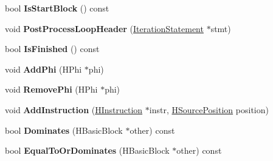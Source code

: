 \begin{DoxyCompactItemize}
\item 
\hypertarget{classv8_1_1internal_1_1_v8___f_i_n_a_l_a2f1d319c2f3bea0f2bbb9d9c973ba372}{}bool {\bfseries Is\+Start\+Block} () const \label{classv8_1_1internal_1_1_v8___f_i_n_a_l_a2f1d319c2f3bea0f2bbb9d9c973ba372}

\item 
\hypertarget{classv8_1_1internal_1_1_v8___f_i_n_a_l_a4c2c1ecf1521e56dd01d13b24f53dd83}{}void {\bfseries Post\+Process\+Loop\+Header} (\hyperlink{classv8_1_1internal_1_1_iteration_statement}{Iteration\+Statement} $\ast$stmt)\label{classv8_1_1internal_1_1_v8___f_i_n_a_l_a4c2c1ecf1521e56dd01d13b24f53dd83}

\item 
\hypertarget{classv8_1_1internal_1_1_v8___f_i_n_a_l_a4defc8dc7df624b3bd15acfb2e90af6b}{}bool {\bfseries Is\+Finished} () const \label{classv8_1_1internal_1_1_v8___f_i_n_a_l_a4defc8dc7df624b3bd15acfb2e90af6b}

\item 
\hypertarget{classv8_1_1internal_1_1_v8___f_i_n_a_l_a19d44c5d0691ad4751c7a1bf9ccd83e6}{}void {\bfseries Add\+Phi} (H\+Phi $\ast$phi)\label{classv8_1_1internal_1_1_v8___f_i_n_a_l_a19d44c5d0691ad4751c7a1bf9ccd83e6}

\item 
\hypertarget{classv8_1_1internal_1_1_v8___f_i_n_a_l_a111d82117cd63dbb69b87e30c1d7a3d6}{}void {\bfseries Remove\+Phi} (H\+Phi $\ast$phi)\label{classv8_1_1internal_1_1_v8___f_i_n_a_l_a111d82117cd63dbb69b87e30c1d7a3d6}

\item 
\hypertarget{classv8_1_1internal_1_1_v8___f_i_n_a_l_a0756352a57ec0c808f16177b287d8ddf}{}void {\bfseries Add\+Instruction} (\hyperlink{classv8_1_1internal_1_1_h_instruction}{H\+Instruction} $\ast$instr, \hyperlink{classv8_1_1internal_1_1_h_source_position}{H\+Source\+Position} position)\label{classv8_1_1internal_1_1_v8___f_i_n_a_l_a0756352a57ec0c808f16177b287d8ddf}

\item 
\hypertarget{classv8_1_1internal_1_1_v8___f_i_n_a_l_af69d88b4c975d05987eaad64feb1d431}{}bool {\bfseries Dominates} (H\+Basic\+Block $\ast$other) const \label{classv8_1_1internal_1_1_v8___f_i_n_a_l_af69d88b4c975d05987eaad64feb1d431}

\item 
\hypertarget{classv8_1_1internal_1_1_v8___f_i_n_a_l_a9488187c40c1a194a9e7990bfce4752d}{}bool {\bfseries Equal\+To\+Or\+Dominates} (H\+Basic\+Block $\ast$other) const \label{classv8_1_1internal_1_1_v8___f_i_n_a_l_a9488187c40c1a194a9e7990bfce4752d}


\end{DoxyCompactItemize}
